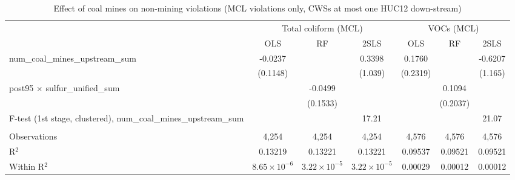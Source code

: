 
\begin{table}[htbp]
   
   \caption{\label{2sls_dwnstrm_nonminevio_mcl_ivsum} Effect of coal mines on non-mining violations (MCL violations only, CWSs at most one HUC12 down-stream)}
   \bigskip
   
   \centering
   
   \begin{adjustbox}{width = \textwidth, center}
      
      
      \begin{tabular}{lcccccc}
         \toprule
         
          & \multicolumn{3}{c}{Total coliform (MCL)} & \multicolumn{3}{c}{VOCs (MCL)}\\
         
                                                                            & OLS                   & RF                    & 2SLS                  & OLS           & RF            & 2SLS\\  
         
         \midrule 
         num\_coal\_mines\_upstream\_sum                                    & -0.0237               &                       & 0.3398                & 0.1760        &               & -0.6207\\   
                                                                            & (0.1148)              &                       & (1.039)               & (0.2319)      &               & (1.165)\\   
         post95 $\times$ sulfur\_unified\_sum                               &                       & -0.0499               &                       &               & 0.1094        &   \\   
                                                                            &                       & (0.1533)              &                       &               & (0.2037)      &   \\   
         
         F-test (1st stage, clustered), num\_coal\_mines\_upstream\_sum     &                       &                       & 17.21                 &               &               & 21.07\\  
         
          \\
         
         Observations                                                       & 4,254                 & 4,254                 & 4,254                 & 4,576         & 4,576         & 4,576\\  
         R$^2$                                                              & 0.13219               & 0.13221               & 0.13221               & 0.09537       & 0.09521       & 0.09521\\  
         Within R$^2$                                                       & $8.65\times 10^{-6}$  & $3.22\times 10^{-5}$  & $3.22\times 10^{-5}$  & 0.00029       & 0.00012       & 0.00012\\  
         

\end{tabular}
\end{adjustbox}
\end{table}
